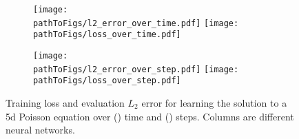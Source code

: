 \begin{figure}[!h]
  \centering
  \def\pathToFigs{../kfac_pinns_exp/exp18_groupplot_poisson5d}
  \begin{subfigure}[t]{1.0\linewidth}
    \caption{}\label{subfig:poisson5d-time}
    \texttt{[image: \\pathToFigs/l2\_error\_over\_time.pdf]}
    \texttt{[image: \\pathToFigs/loss\_over\_time.pdf]}
  \end{subfigure}
  \begin{subfigure}[t]{1.0\linewidth}
    \caption{}\label{subfig:poisson5d-step}
    \texttt{[image: \\pathToFigs/l2\_error\_over\_step.pdf]}
    \texttt{[image: \\pathToFigs/loss\_over\_step.pdf]}
  \end{subfigure}
  \caption{Training loss and evaluation $L_2$ error for learning the solution to a 5d Poisson equation over () time and () steps.
    Columns are different neural networks.}\label{fig:poisson5d-appendix}
\end{figure}

